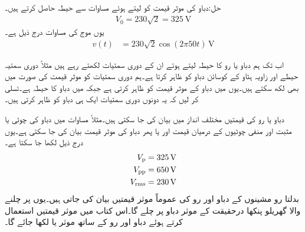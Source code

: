 حل:دباو کی موثر قیمت کو  لیتے ہوئے  مساوات  سے  حیطہ حاصل کرتے ہیں۔
\begin{align}
V_0=230 \sqrt{2}=\SI{325}{\volt}
\end{align}
یوں موج کی مساوات درج ذیل ہے۔
\begin{align}\label{مساوات_طاقت_پاکستانی_گھریلو_دباو}
v(t)&=230 \sqrt{2}\cos (2\pi 50 t)\, \si{\volt}
\end{align}

اب تک ہم دباو یا رو کا حیطہ لیتے ہوئے ان کے دوری سمتیات لکھتے رہے ہیں مثلاً   دوری سمتیہ  حیطے اور  زاویہ ہٹاو کے کوسائن دباو کو ظاہر کرتا ہے۔ہم دوری سمتیات کو موثر قیمت کی صورت میں بھی لکھ سکتے ہیں۔یوں
  میں  دباو کے موثر قیمت کو ظاہر کرتی ہے  جبکہ
  میں  دباو کا حیطہ ہے۔تسلی کر لیں کہ یہ دونوں دوری سمتیات ایک ہی دباو کو ظاہر کرتی ہیں۔

دباو یا رو کی قیمتیں مختلف انداز میں بیان کی جا سکتی  ہیں۔مثلاً مساوات  میں دباو کی چوٹی  یا مثبت اور منفی چوٹیوں کے درمیان قیمت  اور یا پھر دباو کی موثر قیمت  بیان کی جا سکتی ہے۔یوں درج ذیل لکھا جا سکتا ہے۔
\begin{align*}
V_{\textup{p}}&=\SI{325}{\volt}\\
V_{\textup{pp}}&=\SI{650}{\volt}\\
{V_{\textup{rms}}}&=\SI{230}{\volt}
\end{align*}
بدلتا رو مشینوں کے دباو اور رو کی عموماً موثر قیمتیں بیان کی جاتی ہیں۔یوں  پر چلنے والا گھریلو پنکھا درحقیقت  کے موثر دباو پر چلے گا۔اس کتاب میں موثر قیمتیں استعمال کرتے ہوئے دباو اور رو کے ساتھ موثر یا  لکھا جائے گا۔

